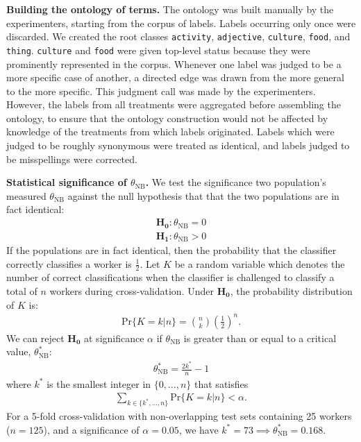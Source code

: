 \documentclass[a4paper]{report}
\begin{document}
\textbf{Building the ontology of terms.}  The ontology was built manually
by the experimenters, starting from the corpus of labels. Labels occurring only 
once were discarded.  We created the root classes \texttt{activity}, 
\texttt{adjective}, \texttt{culture}, 
\texttt{food}, and \texttt{thing}. \texttt{culture} and \texttt{food} were 
given top-level status because they were prominently represented in the corpus.
Whenever one label was judged to be a more specific case of another, a
directed edge was drawn from the more general to the more specific. This
judgment call was made by the experimenters.  However, the labels from all 
treatments were aggregated before assembling the ontology,  to 
ensure that the ontology construction would not be affected by 
knowledge of the treatments from which labels originated. 
Labels which were judged to be roughly synonymous were treated as identical,
and labels judged to be misspellings were corrected. 

\textbf{Statistical significance of $\theta_\text{NB}$.}
We test the significance two population's measured $\theta_\text{NB}$ against 
the null hypothesis that that the two populations are in fact identical:
\begin{align}
	\mathbf{H_0}: \theta_\text{NB} = 0 \\
	\mathbf{H_1}: \theta_\text{NB} > 0
\end{align}
If the populations are in fact identical, then the probability that the 
classifier correctly classifies a worker is $\frac{1}{2}$. Let $K$ be a random
variable which denotes the number of correct classifications when the 
classifier is challenged to classify a total of $n$ workers during 
cross-validation.  Under $\mathbf{H_0}$, the probability distribution of $K$ 
is:
\begin{align}
	\text{Pr}\{K = k | n \} = { n \choose k } \left(\frac{1}{2}\right)^n.
\end{align}
We can reject $\mathbf{H_0}$ at significance $\alpha$ if $\theta_\text{NB}$ 
is greater than or equal to a critical value, $\theta_\text{NB}^*$:
\begin{align}
	\theta^*_\text{NB} = \frac{2k^*}{n} - 1
\end{align}
where $k^*$ is the smallest integer in $\{0,\dots,n\}$ that satisfies 
\begin{align}
	\sum_{k \in \{k^*, \dots, n\}} \text{Pr}\{K = k | n \} < \alpha.
\end{align}
For a 5-fold cross-validation with non-overlapping test sets containing 25 
workers ($n = 125$), and a significance of $\alpha = 0.05$, we
have $k^*=73 \implies \theta_\text{NB}^* = 0.168$.
\end{document}
